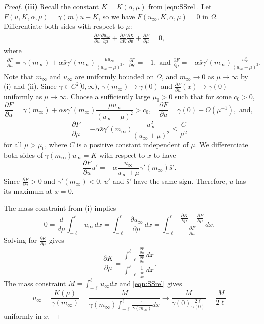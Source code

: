 \documentclass[10pt,a4paper]{amsart}
\begin{document}
\begin{proof}
\textbf{(iii)} Recall the constant $K=K(\alpha,\mu)$ from \eqref{eqn:SSrel}. Let $F(u,K,\alpha,\mu) = \gamma(m)u - K$, so we have $F(u_\infty,K,\alpha,\mu)=0$ in $\overline{\Omega}$. Differentiate both sides with respect to $\mu$:
\begin{align}\label{eqn: total deriv}
    \frac{\partial F}{\partial u}  \frac{\partial u_\infty}{\partial \mu} +\frac{\partial F}{\partial K} \frac{\partial K}{\partial \mu}  +\frac{\partial F}{\partial \mu}  =0,
\end{align} where
\begin{align*}
    \frac{\partial F}{\partial u}  = \gamma(m_\infty) +\alpha \bar s\gamma'(m_\infty) \frac{\mu u_\infty}{(u_\infty+\mu)^2}, \,\,\frac{\partial F}{\partial K}  = -1, \text{ and } \frac{\partial F}{\partial \mu}  = -\alpha\bar s\gamma'(m_\infty) \frac{u_\infty^2}{(u_\infty+\mu)^2}.
\end{align*}
Note that $m_\infty$ and $u_\infty$ are uniformly bounded on $\overline{\Omega}$, and $m_\infty \to 0$ as $\mu\to\infty$ by (i) and (ii). Since $\gamma\in C^2[0,\infty)$, $\gamma(m_\infty)\to\gamma(0)$ and $\frac{\partial F}{\partial u} (x)\to \gamma(0)$ uniformly as $\mu\to\infty$.  Choose a sufficiently large $\mu_0>0$ such that for some $c_0>0$,
\[\frac{\partial F}{\partial u}  = \gamma(m_\infty) +\alpha \bar s\gamma'(m_\infty) \frac{\mu u_\infty}{(u_\infty+\mu)^2}>c_0,\quad \frac{\partial F}{\partial u} =\gamma(0)+O(\mu^{-1}), \text{ and, }\]\[\frac{\partial F}{\partial \mu}  = -\alpha\bar s\gamma'(m_\infty)\frac{u_\infty^2}{(u_\infty+\mu)^2}\le \frac{C}{\mu^2} \] for all  $ \mu>\mu_0$, where $C$ is a positive constant independent of $\mu$. We  differentiate both sides of $\gamma(m_\infty)u_\infty=K$ with respect to $x$ to have
\[ \frac{\partial F}{\partial u}u' = -\alpha\frac{u_\infty}{u_\infty+\mu}\gamma'(m_\infty)\bar s'. \] Since $\frac{\partial F}{\partial u}>0$ and $ \gamma'(m_\infty)<0$, $u'$ and $\bar s'$ have the same sign. Therefore, $u$ has its maximum at $x=0$.

The mass constraint from (i) implies
\[
0 = \frac{d}{d\mu}\int_{-\ell}^{\ell} u_\infty\,dx
= \int_{-\ell}^{\ell} \frac{\partial u_\infty}{\partial \mu}\,dx
= \int_{-\ell}^{\ell} \frac{\frac{\partial K}{\partial \mu}  - \frac{\partial F}{\partial \mu} }{\frac{\partial F}{\partial u} }\,dx.
\]
Solving for $\frac{\partial K}{\partial \mu} $ gives
\[
\frac{\partial K}{\partial \mu} 
=
\frac{\displaystyle\int_{-\ell}^{\ell} \frac{\frac{\partial F}{\partial \mu} }{\frac{\partial F}{\partial u} }\,dx}
{\displaystyle\int_{-\ell}^{\ell} \frac{1}{\frac{\partial F}{\partial u} }\,dx}.
\]
The mass constraint $M=\int_{-\ell}^{\ell}u_\infty dx$ and \eqref{eqn:SSrel} gives
\[u_\infty = \frac{K(\mu)}{\gamma(m_\infty)} = \displaystyle\frac{M}{\gamma(m_\infty)\int_{-\ell}^{\ell}\frac{1}{\gamma(m_\infty)}dx}\to \frac{M}{\gamma(0)\frac{2\ell}{\gamma(0)}}=\frac{M}{2\ell}\] uniformly in $x$.


\end{proof}
\end{document}
